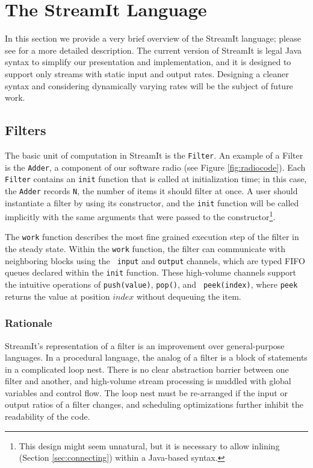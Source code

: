 \section{The StreamIt Language}
\label{sec:language}

In this section we provide a very brief overview of the StreamIt
language; please see \cite{streamittech} for a more detailed
description.  The current version of StreamIt is legal Java syntax to
simplify our presentation and implementation, and it is designed to
support only streams with static input and output rates.  Designing a
cleaner syntax and considering dynamically varying rates will be the
subject of future work.

\subsection{Filters}

The basic unit of computation in StreamIt is the {\tt Filter}.  An
example of a Filter is the {\tt Adder}, a component of our
software radio (see Figure \ref{fig:radiocode}).  Each {\tt Filter}
contains an {\tt init} function that is called at initialization time;
in this case, the {\tt Adder} records {\tt N}, the number of
items it should filter at once.  A user should instantiate a filter by
using its constructor, and the {\tt init} function will be called
implicitly with the same arguments that were passed to the
constructor{\footnote{This design might seem unnatural, but it is
necessary to allow inlining (Section \ref{sec:connecting}) within a
Java-based syntax.}}.

The {\tt work} function describes the most fine grained execution step
of the filter in the steady state.  Within the {\tt work} function,
the filter can communicate with neighboring blocks using the {\tt
input} and {\tt output} channels, which are typed FIFO queues declared
within the {\tt init} function.  These high-volume channels support
the intuitive operations of {\tt push(value)}, {\tt pop()}, and {\tt
peek(index)}, where {\tt peek} returns the value at position $index$
without dequeuing the item.

\subsubsection{Rationale}

StreamIt's representation of a filter is an improvement over
general-purpose languages.  In a procedural language, the analog of a
filter is a block of statements in a complicated loop nest.  There is
no clear abstraction barrier between one filter and another, and
high-volume stream processing is muddled with global variables and
control flow. The loop nest must be re-arranged if the input or output
ratios of a filter changes, and scheduling optimizations further
inhibit the readability of the code.

